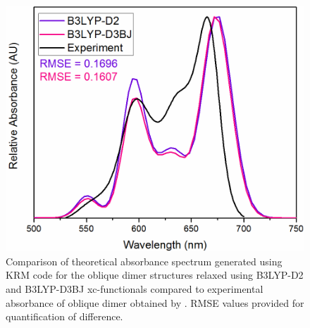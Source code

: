\begin{figure}[h!]
  \centering
  \includegraphics[width=0.8\linewidth]{figures/pub1/ob-dimer-B3LYP-D3andD2.pdf}
  \caption[Comparison of theoretical absorbance spectrum generated using KRM code for the oblique dimer structures relaxed using B3LYP-D2 and B3LYP-D3BJ xc-functionals compared to experimental absorbance of oblique dimer obtained by Cannon. RMSE values provided for quantification of difference.]{Comparison of theoretical absorbance spectrum generated using KRM code for the oblique dimer structures relaxed using B3LYP-D2 and B3LYP-D3BJ xc-functionals compared to experimental absorbance of oblique dimer obtained by \citet{Cannon2017}. RMSE values provided for quantification of difference.}\label{spectra-d2d3}
\end{figure}


